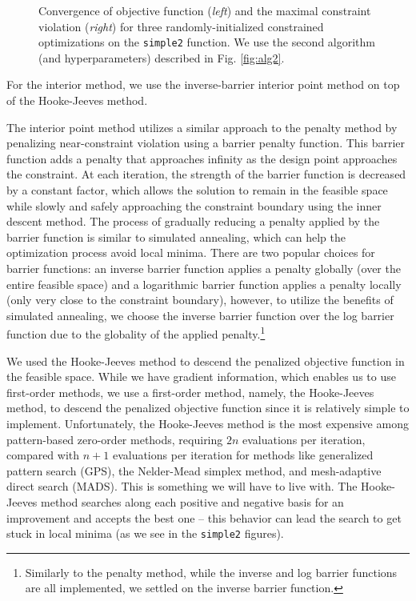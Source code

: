 \documentclass[conference]{IEEEtran}
\begin{document}
\begin{figure*}[htb]
    \centering
     \hspace*{6em}
    
    \caption{Convergence of objective function (\textit{left}) and the maximal constraint violation (\textit{right}) for three randomly-initialized constrained optimizations on the \texttt{simple2} function. We use the second algorithm (and hyperparameters) described in Fig. \ref{fig:alg2}.}
    \label{fig:alg2_conv}
\end{figure*}

For the interior method, we use the inverse-barrier interior point method on top of the Hooke-Jeeves method.

The interior point method utilizes a similar approach to the penalty method by penalizing near-constraint violation using a barrier penalty function. This barrier function adds a penalty that approaches infinity as the design point approaches the constraint. At each iteration, the strength of the barrier function is decreased by a constant factor, which allows the solution to remain in the feasible space while slowly and safely approaching the constraint boundary using the inner descent method. The process of gradually reducing a penalty applied by the barrier function is similar to simulated annealing, which can help the optimization process avoid local minima. There are two popular choices for barrier functions: an inverse barrier function applies a penalty globally (over the entire feasible space) and a logarithmic barrier function applies a penalty locally (only very close to the constraint boundary), however, to utilize the benefits of simulated annealing, we choose the inverse barrier function over the log barrier function due to the globality of the applied penalty.\footnote{Similarly to the penalty method, while the inverse and log barrier functions are all implemented, we settled on the inverse barrier function.}

We used the Hooke-Jeeves method to descend the penalized objective function in the feasible space. While we have gradient information, which enables us to use first-order methods, we use a first-order method, namely, the Hooke-Jeeves method, to descend the penalized objective function since it is relatively simple to implement. Unfortunately, the Hooke-Jeeves method is the most expensive among pattern-based zero-order methods, requiring $2n$ evaluations per iteration, compared with $n+1$ evaluations per iteration for methods like generalized pattern search (GPS), the Nelder-Mead simplex method, and mesh-adaptive direct search (MADS). This is something we will have to live with. The Hooke-Jeeves method searches along each positive and negative basis for an improvement and accepts the best one -- this behavior can lead the search to get stuck in local minima (as we see in the \texttt{simple2} figures).
\end{document}
